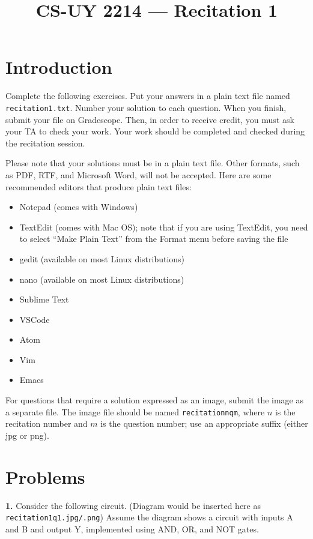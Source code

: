 \documentclass{article}
\title{CS-UY 2214 — Recitation 1}
\date{}
\begin{document}
\maketitle

\section*{Introduction}
Complete the following exercises. Put your answers in a plain text file named \texttt{recitation1.txt}. Number your solution to each question. When you finish, submit your file on Gradescope. Then, in order to receive credit, you must ask your TA to check your work. Your work should be completed and checked during the recitation session.

Please note that your solutions must be in a plain text file. Other formats, such as PDF, RTF, and Microsoft Word, will not be accepted. Here are some recommended editors that produce plain text files:
\begin{itemize}
    \item Notepad (comes with Windows)
    \item TextEdit (comes with Mac OS); note that if you are using TextEdit, you need to select “Make Plain Text” from the Format menu before saving the file
    \item gedit (available on most Linux distributions)
    \item nano (available on most Linux distributions)
    \item Sublime Text
    \item VSCode
    \item Atom
    \item Vim
    \item Emacs
\end{itemize}

For questions that require a solution expressed as an image, submit the image as a separate file. The image file should be named \texttt{recitationnqm}, where $n$ is the recitation number and $m$ is the question number; use an appropriate suffix (either jpg or png).

\section*{Problems}
\noindent\textbf{1.} Consider the following circuit.  (Diagram would be inserted here as \texttt{recitation1q1.jpg/.png})  Assume the diagram shows a circuit with inputs A and B and output Y, implemented using AND, OR, and NOT gates.
\end{document}
